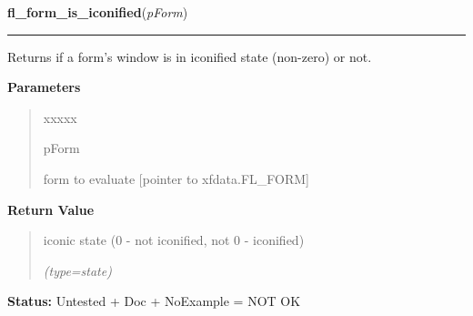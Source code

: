 \hspace{.8\funcindent}\begin{boxedminipage}{\funcwidth}

    \raggedright \textbf{fl\_form\_is\_iconified}(\textit{pForm})

    \vspace{-1.5ex}

    \rule{\textwidth}{0.5\fboxrule}
\setlength{\parskip}{2ex}
    Returns if a form's window is in iconified state (non-zero) or not.

\setlength{\parskip}{1ex}
      \textbf{Parameters}
      \vspace{-1ex}

      \begin{quote}
        \begin{Ventry}{xxxxx}

          \item[pForm]

          form to evaluate [pointer to xfdata.FL\_FORM]

        \end{Ventry}

      \end{quote}

      \textbf{Return Value}
    \vspace{-1ex}

      \begin{quote}
      iconic state (0 - not iconified, not 0 - iconified)

      {\it (type=state)}

      \end{quote}

\textbf{Status:} Untested + Doc + NoExample = NOT OK



    \end{boxedminipage}

    \label{xformslib:library:fl_register_raw_callback}

    \vspace{0.5ex}

